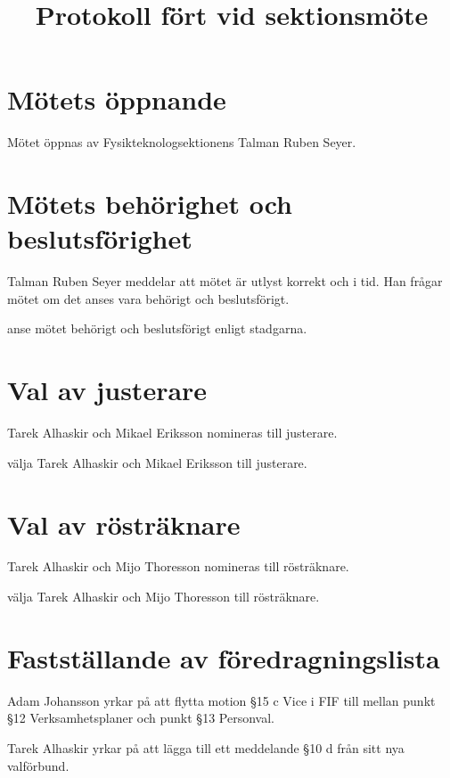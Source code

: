 \documentclass[hidelinks]{sektionsmote}
\title{Protokoll fört vid sektionsmöte}
\begin{document}
\maketitle

\section{Mötets öppnande}
Mötet öppnas \tid av Fysikteknologsektionens Talman Ruben Seyer.


\section{Mötets behörighet och beslutsförighet}
Talman Ruben Seyer meddelar att mötet är utlyst korrekt och i tid.
Han frågar mötet om det anses vara behörigt och beslutsförigt.
\begin{beslut}
    \item anse mötet behörigt och beslutsförigt enligt stadgarna.
\end{beslut}


\section{Val av justerare}
Tarek Alhaskir och Mikael Eriksson nomineras till justerare.
\begin{beslut}
  \item välja Tarek Alhaskir och Mikael Eriksson till justerare.
\end{beslut}


\section{Val av rösträknare}
Tarek Alhaskir och Mijo Thoresson nomineras till rösträknare.
\begin{beslut}
  \item välja Tarek Alhaskir och Mijo Thoresson till rösträknare.
\end{beslut}


\section{Fastställande av föredragningslista}
Adam Johansson yrkar på att flytta motion §15 c Vice i FIF till mellan punkt §12 Verksamhetsplaner och punkt §13 Personval.

Tarek Alhaskir yrkar på att lägga till ett meddelande §10 d från sitt nya valförbund.
\end{document}
